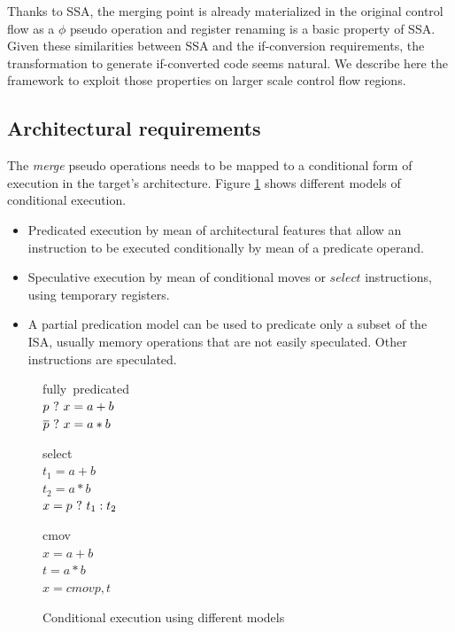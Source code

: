 Thanks to SSA, the merging point is already materialized in the original control flow as a $\phi$ pseudo operation and register renaming is a basic property of SSA. Given these similarities between SSA and the if-conversion requirements, the transformation to generate if-converted code seems natural. We describe here the framework to exploit those properties on larger scale control flow regions.

\subsection{Architectural requirements}

The \textit{merge} pseudo operations needs to be mapped to a conditional form of execution in the target's architecture. Figure \ref{fig:pred} shows different models of conditional execution.

\begin{itemize}
\item Predicated execution by mean of architectural features that allow an instruction to be executed conditionally by mean of a predicate operand.
\item Speculative execution by mean of conditional moves or $select$ instructions, using temporary registers. 
\item A partial predication model can be used to predicate only a subset of the ISA, usually memory operations that are not easily speculated. Other instructions are speculated.
\end{itemize}

\begin{figure}
\footnotesize
\begin{minipage}[t]{3cm}
\mbox{fully predicated} \\
$p ~?~ x = a + b $ \\
$\overline{p} ~?~ x = a * b $ \\
\end{minipage} 
\begin{minipage}[t]{3cm}
\mbox{select} \\
$t_1 = a + b $ \\
$t_2 = a * b $ \\
$x= p ~?~ t_1 : t_2 $ \\
\end{minipage}
\begin{minipage}[t]{3cm}
\mbox{cmov} \\
$x = a + b $ \\
$t = a * b $ \\
$x = cmov p,t$ \\
\end{minipage}
\caption{Conditional execution using different models}
\label{fig:pred}
\end{figure}

